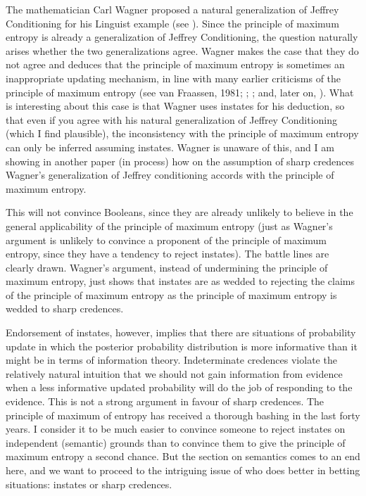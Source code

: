 \documentclass[11pt]{article}
\begin{document}
The mathematician Carl Wagner proposed a natural generalization of
Jeffrey Conditioning for his Linguist example (see
). Since the principle of maximum entropy is
already a generalization of Jeffrey Conditioning, the question
naturally arises whether the two generalizations agree. Wagner makes
the case that they do not agree and deduces that the principle of
maximum entropy is sometimes an inappropriate updating mechanism, in
line with many earlier criticisms of the principle of maximum entropy
(see van Fraassen, 1981;
; ; and, later on,
). What is interesting about this case is
that Wagner uses instates for his deduction, so that even if you agree
with his natural generalization of Jeffrey Conditioning (which I find
plausible), the inconsistency with the principle of maximum entropy
can only be inferred assuming instates. Wagner is unaware of this, and
I am showing in another paper (in process) how on the assumption of
sharp credences Wagner's generalization of Jeffrey conditioning
accords with the principle of maximum entropy.

This will not convince Booleans, since they are already unlikely to
believe in the general applicability of the principle of maximum
entropy (just as Wagner's argument is unlikely to convince a proponent
of the principle of maximum entropy, since they have a tendency to
reject instates). The battle lines are clearly drawn. Wagner's
argument, instead of undermining the principle of maximum entropy,
just shows that instates are as wedded to rejecting the claims of the
principle of maximum entropy as the principle of maximum entropy is
wedded to sharp credences.

Endorsement of instates, however, implies that there are situations of
probability update in which the posterior probability distribution is
more informative than it might be in terms of information theory.
Indeterminate credences violate the relatively natural intuition that
we should not gain information from evidence when a less informative
updated probability will do the job of responding to the evidence.
This is not a strong argument in favour of sharp credences. The
principle of maximum of entropy has received a thorough bashing in the
last forty years. I consider it to be much easier to convince someone
to reject instates on independent (semantic) grounds than to convince
them to give the principle of maximum entropy a second chance. But the
section on semantics comes to an end here, and we want to proceed to
the intriguing issue of who does better in betting situations:
instates or sharp credences.
\end{document}
